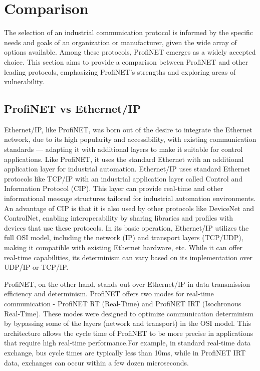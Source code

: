 \documentclass[conference]{IEEEtran}
\begin{document}
\section{Comparison}
The selection of an industrial communication protocol is informed by the specific needs and goals of an organization or manufacturer, given the wide array of options available. Among these protocols, ProfiNET emerges as a widely accepted choice. This section aims to provide a comparison between ProfiNET and other leading protocols, emphasizing ProfiNET's strengths and exploring areas of vulnerability. 

\subsection{ProfiNET vs Ethernet/IP}
Ethernet/IP, like ProfiNET, was born out of the desire to integrate the Ethernet network, due to its high popularity and accessibility, with existing communication standards — adapting it with additional layers to make it suitable for control applications. Like ProfiNET, it uses the standard Ethernet with an additional application layer for industrial automation. Ethernet/IP uses standard Ethernet protocols like TCP/IP with an industrial application layer called Control and Information Protocol (CIP). This layer can provide real-time and other informational message structures tailored for industrial automation environments. An advantage of CIP is that it is also used by other protocols like DeviceNet and ControlNet, enabling interoperability by sharing libraries and profiles with devices that use these protocols\cite{Acromag2020EthernetIP}. In its basic operation, Ethernet/IP utilizes the full OSI model, including the network (IP) and transport layers (TCP/UDP), making it compatible with existing Ethernet hardware, etc. While it can offer real-time capabilities, its determinism can vary based on its implementation over UDP/IP or TCP/IP.

ProfiNET, on the other hand, stands out over Ethernet/IP in data transmission efficiency and determinism. ProfiNET offers two modes for real-time communication - ProfiNET RT (Real-Time) and ProfiNET IRT (Isochronous Real-Time). These modes were designed to optimize communication determinism by bypassing some of the layers (network and transport) in the OSI model\cite{ProfinetCommunicationChannels}. This architecture allows the cycle time of ProfiNET to be more precise in applications that require high real-time performance.For example, in standard real-time data exchange,  bus cycle times are typically less than 10ms, while in ProfiNET IRT data, exchanges can occur within a few dozen microseconds\cite{Eitel2020EtherNetVsPROFINET}.
\end{document}
